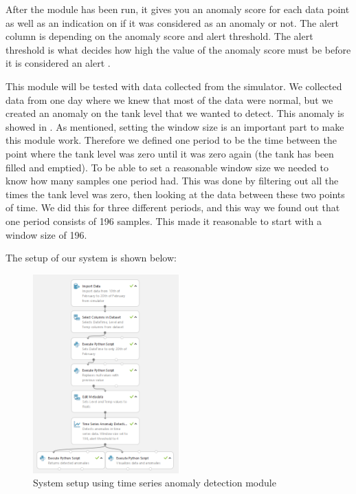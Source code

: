 \documentclass[english, a4paper]{report}
\begin{document}
{{{            After the module has been run, it gives you an anomaly score for each data point as well as an indication on if it was considered as an anomaly or not. The alert column is depending on the anomaly score and alert threshold. The alert threshold is what decides how high the value of the anomaly score must be before it is considered an alert \cite{azureTimeSeriesAD}. 
            \par
            
            This module will be tested with data collected from the simulator. We collected data from one day where we knew that most of the data were normal, but we created an anomaly on the tank level that we wanted to detect. This anomaly is showed in . As mentioned, setting the window size is an important part to make this module work. Therefore we defined one period to be the time between the point where the tank level was zero until it was zero again (the tank has been filled and emptied). To be able to set a reasonable window size we needed to know how many samples one period had. This was done by filtering out all the times the tank level was zero, then looking at the data between these two points of time. We did this for three different periods, and this way we found out that one period consists of 196 samples. This made it reasonable to start with a window size of 196. \par 
            
            The setup of our system is shown below:
            
            \begin{figure}[H]
                \centering
                \includegraphics[width=0.5\textwidth]{timeSeriesAnomalyDetection}
                \caption{System setup using time series anomaly detection module}
                \label{fig:timeSeriesAnomalyDetection}
            \end{figure}
            
}}}
\end{document}
